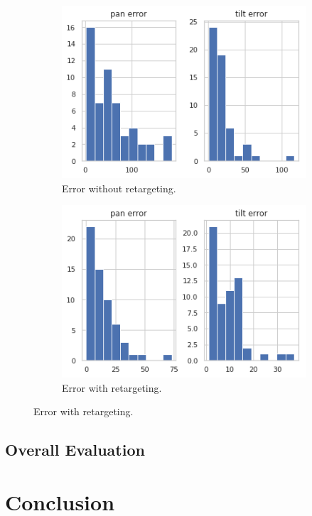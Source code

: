 \documentclass{l4proj}
\begin{document}
\begin{figure}[H]
  \begin{subfigure}[b]{0.5\textwidth}
    \includegraphics[width=\textwidth]{l4template-master/images/without.png}
    \caption{Error without retargeting.}
    \label{errorwithoutretargetting}
  \end{subfigure}
  \begin{subfigure}[b]{0.5\textwidth}
    \includegraphics[width=\textwidth]{l4template-master/images/with_retargetting.png}
    \caption{Error with retargeting.}
    \label{errorwithretargetting}
  \end{subfigure}
\end{figure}

\section{Overall Evaluation}


\chapter{Conclusion}












\end{document}
